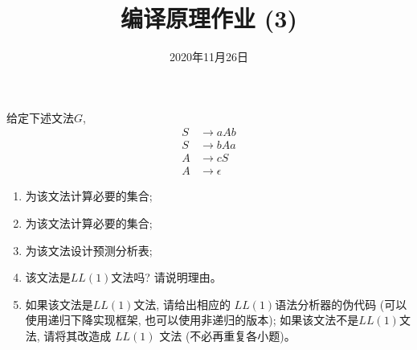 \documentclass[a4paper, justified]{tufte-handout}
\title{编译原理作业 (3)}
\date{2020年11月26日}
\begin{document}
\maketitle
\noplagiarism %
\begin{abstract}
\end{abstract}
\beginrequired

\begin{problem}[\score{10 = 2 + 2 + 2 + 1 + 3}]
  给定下述文法$G$,
  \begin{align}
    S &\to aAb \\[8pt]
    S &\to bAa \\[8pt]
    A &\to cS \\[8pt]
    A &\to \epsilon
  \end{align}

  \begin{enumerate}[(1)]
    \item 为该文法计算必要的\first{}集合;
    \item 为该文法计算必要的\follow{}集合;
    \item 为该文法设计预测分析表;
    \item 该文法是$LL(1)$文法吗? 请说明理由。
    \item 如果该文法是$LL(1)$文法, 请给出相应的 $LL(1)$语法分析器的伪代码
      (可以使用递归下降实现框架, 也可以使用非递归的版本);
      如果该文法不是$LL(1)$文法, 请将其改造成 $LL(1)$ 文法 (不必再重复各小题)。
  \end{enumerate}
\end{problem}
\end{document}
